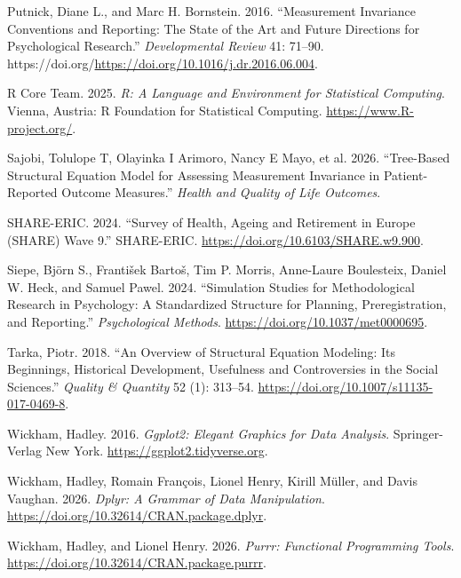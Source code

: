 \documentclass[
  man,
  floatsintext]{apa7}
\newlength{\cslhangindent}
\newenvironment{CSLReferences}[2] %
 {\begin{list}{}{%
  \setlength{\itemindent}{0pt}
  \setlength{\leftmargin}{0pt}
  \setlength{\parsep}{0pt}
  \ifodd #1
   \setlength{\leftmargin}{\cslhangindent}
   \setlength{\itemindent}{-1\cslhangindent}
  \fi
  \setlength{\itemsep}{#2\baselineskip}}}
 {\end{list}}
\begin{document}
\begin{CSLReferences}{1}{0}
Putnick, Diane L., and Marc H. Bornstein. 2016. {``Measurement
Invariance Conventions and Reporting: The State of the Art and Future
Directions for Psychological Research.''} \emph{Developmental Review}
41: 71--90.
https://doi.org/\url{https://doi.org/10.1016/j.dr.2016.06.004}.

R Core Team. 2025. \emph{R: A Language and Environment for Statistical
Computing}. Vienna, Austria: R Foundation for Statistical Computing.
\url{https://www.R-project.org/}.

{Sajobi, Tolulope T, Olayinka I Arimoro, Nancy E Mayo, et al.} 2026.
{``Tree-Based Structural Equation Model for Assessing Measurement
Invariance in Patient-Reported Outcome Measures.''} \emph{Health and
Quality of Life Outcomes}.

SHARE-ERIC. 2024. {``{Survey of Health, Ageing and Retirement in Europe
(SHARE) Wave 9}.''} SHARE-ERIC.
\url{https://doi.org/10.6103/SHARE.w9.900}.

Siepe, Björn S., František Bartoš, Tim P. Morris, Anne-Laure Boulesteix,
Daniel W. Heck, and Samuel Pawel. 2024. {``Simulation Studies for
Methodological Research in Psychology: A Standardized Structure for
Planning, Preregistration, and Reporting.''} \emph{Psychological
Methods}. \url{https://doi.org/10.1037/met0000695}.

Tarka, Piotr. 2018. {``An Overview of Structural Equation Modeling: Its
Beginnings, Historical Development, Usefulness and Controversies in the
Social Sciences.''} \emph{Quality \& Quantity} 52 (1): 313--54.
\url{https://doi.org/10.1007/s11135-017-0469-8}.

Wickham, Hadley. 2016. \emph{Ggplot2: Elegant Graphics for Data
Analysis}. Springer-Verlag New York.
\url{https://ggplot2.tidyverse.org}.

Wickham, Hadley, Romain François, Lionel Henry, Kirill Müller, and Davis
Vaughan. 2026. \emph{Dplyr: A Grammar of Data Manipulation}.
\url{https://doi.org/10.32614/CRAN.package.dplyr}.

Wickham, Hadley, and Lionel Henry. 2026. \emph{Purrr: Functional
Programming Tools}. \url{https://doi.org/10.32614/CRAN.package.purrr}.


\end{CSLReferences}
\end{document}
